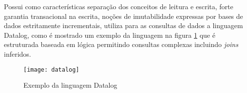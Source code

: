Possui como características separação dos conceitos de leitura e escrita, forte garantia transacional na escrita, noções de imutabilidade expressas por bases de dados estritamente incrementais, utiliza para as consultas de dados a linguagem Datalog, como é mostrado um exemplo da linguagem na figura \ref{fig:datalog} que é estruturada baseada em lógica permitindo consultas complexas incluindo \textit{joins} inferidos.~\cite{datomic} 

\begin{figure}[!h]
\caption{\label{fig:datalog} Exemplo da linguagem Datalog}
\begin{center}
\texttt{[image: datalog]}
\end{center}
\end{figure}



